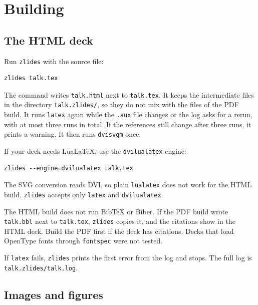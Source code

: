 \documentclass[11pt]{article}
\newcommand{\cmd}[1]{\texttt{#1}}
\begin{document}
\section{Building}

\subsection{The HTML deck}

Run \cmd{zlides} with the source file:
\begin{lstlisting}
zlides talk.tex
\end{lstlisting}
The command writes \cmd{talk.html} next to \cmd{talk.tex}. It keeps the
intermediate files in the directory \cmd{talk.zlides/}, so they do not mix with
the files of the PDF build. It runs \cmd{latex} again while the \cmd{.aux} file
changes or the log asks for a rerun, with at most three runs in total. If the
references still change after three runs, it prints a warning. It then runs
\cmd{dvisvgm} once.

If your deck needs LuaLaTeX, use the \cmd{dvilualatex} engine:
\begin{lstlisting}
zlides --engine=dvilualatex talk.tex
\end{lstlisting}
The SVG conversion reads DVI, so plain \cmd{lualatex} does not work for the HTML
build. \cmd{zlides} accepts only \cmd{latex} and \cmd{dvilualatex}.

The HTML build does not run BibTeX or Biber. If the PDF build wrote
\cmd{talk.bbl} next to \cmd{talk.tex}, \cmd{zlides} copies it, and the
citations show in the HTML deck. Build the PDF first if the deck has citations. Decks that load OpenType fonts through \cmd{fontspec} were not tested.

If \cmd{latex} fails, \cmd{zlides} prints the first error from the log and stops.
The full log is \cmd{talk.zlides/talk.log}.

\subsection{Images and figures}
\end{document}
